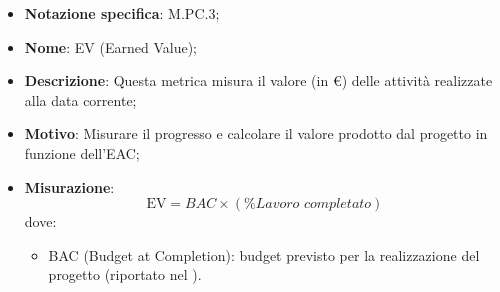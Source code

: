 \begin{itemize}
    \item \textbf{Notazione specifica}: M.PC.3;
    \item \textbf{Nome}: EV (Earned Value);
    \item \textbf{Descrizione}: Questa metrica misura il valore (in €) delle attività realizzate alla data corrente;
    \item \textbf{Motivo}: Misurare il progresso e calcolare il valore prodotto dal progetto in funzione dell'EAC;
    \item \textbf{Misurazione}:
    \[
        \text{EV} = \textit{BAC} \times (\% {\textit{Lavoro completato}})
    \]
    dove:
    \begin{itemize}
        \item BAC (Budget at Completion): budget previsto per la realizzazione del progetto (riportato nel \VersionePP).
    \end{itemize}
\end{itemize}
